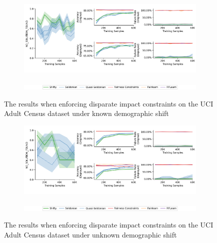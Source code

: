 \begin{figure}[h]
    \centering
    \begin{subfigure}[b]{1\linewidth}
        \includegraphics[width=\textwidth]{img/charts/adult/fixed/iclr_adult_demographic_shift_sex_di.png}
    \end{subfigure}
    \begin{subfigure}[b]{1\linewidth}
        \includegraphics[width=\textwidth]{img/charts/iclr_legend.png} 
    \end{subfigure}
    \caption{The results when enforcing disparate impact constraints on the UCI Adult Census dataset under known demographic shift}\label{fig:labelfreebrazil}
\end{figure}

\vspace{-20pt}

\begin{figure}[h]
    \centering
    \begin{subfigure}[b]{1\linewidth}
        \includegraphics[width=\textwidth]{img/charts/adult/antag/iclr_adult_demographic_shift_sex_di.png}
    \end{subfigure}
    \begin{subfigure}[b]{1\linewidth}
        \includegraphics[width=\textwidth]{img/charts/iclr_legend.png} 
    \end{subfigure}
    \caption{The results when enforcing disparate impact constraints on the UCI Adult Census dataset under unknown demographic shift}
\label{fig:labelfreeadult}
\end{figure}


